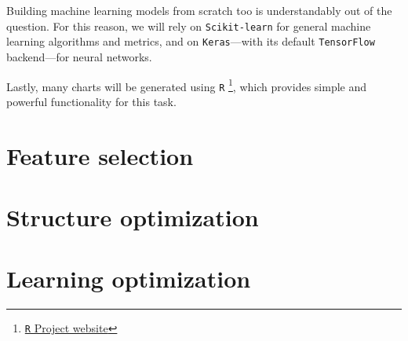 		Building machine learning models from scratch too is understandably out of the question. For this reason, we will rely on \texttt{Scikit-learn} for general machine learning algorithms and metrics, and on \texttt{Keras}---with its default \texttt{TensorFlow} backend---for neural networks.

		Lastly, many charts will be generated using \texttt{R}  \footnote{\href{https://www.r-project.org/}{\texttt{R} Project website}}, which provides simple and powerful functionality for this task.

\section{Feature selection}\label{sec:res_fs}

\section{Structure optimization}\label{sec:res_so}

\section{Learning optimization}\label{sec:res_lo}